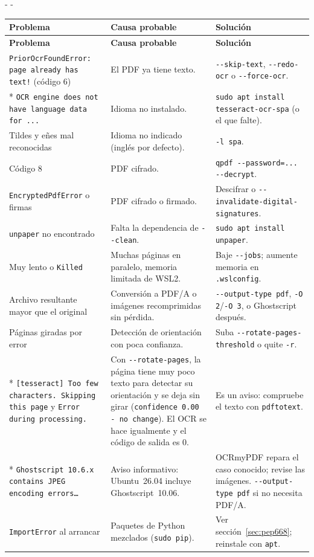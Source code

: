 \documentclass[11pt,a4paper]{article}
\makeatletter
\newcommand{\necesitaespacio}[1]{\par\penalty-100\begingroup
	\setlength{\dimen@}{#1}\dimen@ii\pagegoal\advance\dimen@ii-\pagetotal
	\ifdim\dimen@>\dimen@ii\ifdim\dimen@ii>\z@\vfil\fi\penalty-\@M\fi\endgroup}
\newenvironment{errores}{%
	\par\begingroup\small
	\begin{longtable}{L{4.1cm}L{4.9cm}L{6.0cm}}
		\toprule\rowcolor{tablacab}\cab{Problema} & \cab{Causa probable} & \cab{Solución} \\ \midrule
		\endfirsthead
		\toprule\rowcolor{tablacab}\cab{Problema} & \cab{Causa probable} & \cab{Solución} \\ \midrule
		\endhead
		\bottomrule
		\endfoot}
	{\end{longtable}\endgroup}
\newcommand{\cmd}[1]{\texttt{\textcolor{colcmd}{#1}}}      %
\newcommand{\opt}[1]{\texttt{\textcolor{colopt}{#1}}}      %
\newcommand{\arch}[1]{\texttt{\textcolor{colarch}{#1}}}    %
\newcommand{\cab}[1]{\textbf{#1}}
\makeatother
\begin{document}
	\necesitaespacio{10\baselineskip}
	\begin{errores}
		\texttt{PriorOcrFoundError: page already has text!} (código 6) & El PDF ya tiene texto. & \opt{-{}-skip-text}, \opt{-{}-redo-ocr} o \opt{-{}-force-ocr}.\\*
		\texttt{OCR engine does not have language data for ...} & Idioma no instalado. & \cmd{sudo apt install tesseract-\allowbreak{}ocr-\allowbreak{}spa} (o el que falte).\\
		Tildes y eñes mal reconocidas & Idioma no indicado (inglés por defecto). & \opt{-l spa}.\\
		Código 8 & PDF cifrado. & \cmd{qpdf -{}-password=\allowbreak{}... -{}-decrypt}.\\
		\texttt{EncryptedPdfError} o firmas & PDF cifrado o firmado. & Descifrar o \opt{-{}-invalidate-\allowbreak{}digital-\allowbreak{}signatures}.\\
		\texttt{unpaper} no encontrado & Falta la dependencia de \opt{-{}-clean}. & \cmd{sudo apt install unpaper}.\\
		Muy lento o \texttt{Killed} & Muchas páginas en paralelo, memoria limitada de WSL2. & Baje \opt{-{}-jobs}; aumente memoria en \arch{.wslconfig}.\\
		Archivo resultante mayor que el original & Conversión a PDF/A o imágenes recomprimidas sin pérdida. & \opt{-{}-output-\allowbreak{}type pdf}, \opt{-O 2}/\opt{-O 3}, o Ghostscript después.\\
		Páginas giradas por error & Detección de orientación con poca confianza. & Suba \opt{-{}-rotate-\allowbreak{}pages-\allowbreak{}threshold} o quite \opt{-r}.\\*
		\texttt{[tesseract] Too few characters. Skipping this page} y \texttt{Error during processing.} & Con \opt{-{}-rotate-\allowbreak{}pages}, la página tiene muy poco texto para detectar su orientación y se deja sin girar (\texttt{confidence 0.00 - no change}). El OCR se hace igualmente y el código de salida es 0. & Es un aviso: compruebe el texto con \cmd{pdftotext}.\\*
		\texttt{Ghostscript 10.6.x contains JPEG encoding errors\ldots} & Aviso informativo: Ubuntu~26.04 incluye Ghostscript~10.06. & OCRmyPDF repara el caso conocido; revise las imágenes. \opt{-{}-output-\allowbreak{}type pdf} si no necesita PDF/A.\\
		\texttt{ImportError} al arrancar & Paquetes de Python mezclados (\cmd{sudo pip}). & Ver sección~\ref{sec:pep668}; reinstale con \cmd{apt}.\\
	\end{errores}
	
\end{document}
